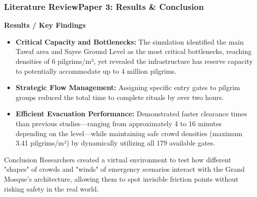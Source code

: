 \documentclass{beamer}
\begin{document}
\begin{frame}
\frametitle{Literature Review\newline Paper 3: Results \& Conclusion}
\scriptsize

\textbf{Results / Key Findings}
\begin{itemize}
    \item \textbf{Critical Capacity and Bottlenecks:} The simulation identified the main Tawaf area and Sayee Ground Level as the most critical bottlenecks, reaching densities of 6 pilgrims/m², yet revealed the infrastructure has reserve capacity to potentially accommodate up to 4 million pilgrims.
    \item \textbf{Strategic Flow Management:} Assigning specific entry gates to pilgrim groups reduced the total time to complete rituals by over two hours.
    \item \textbf{Efficient Evacuation Performance:} Demonstrated faster clearance times than previous studies—ranging from approximately 4 to 16 minutes depending on the level—while maintaining safe crowd densities (maximum 3.41 pilgrims/m²) by dynamically utilizing all 179 available gates.
\end{itemize}

\begin{alertblock}{Conclusion}
Researchers created a virtual environment to test how different "shapes" of crowds and "winds" of emergency scenarios interact with the Grand Mosque's architecture, allowing them to spot invisible friction points without risking safety in the real world.
\end{alertblock}
\end{frame}
\end{document}
